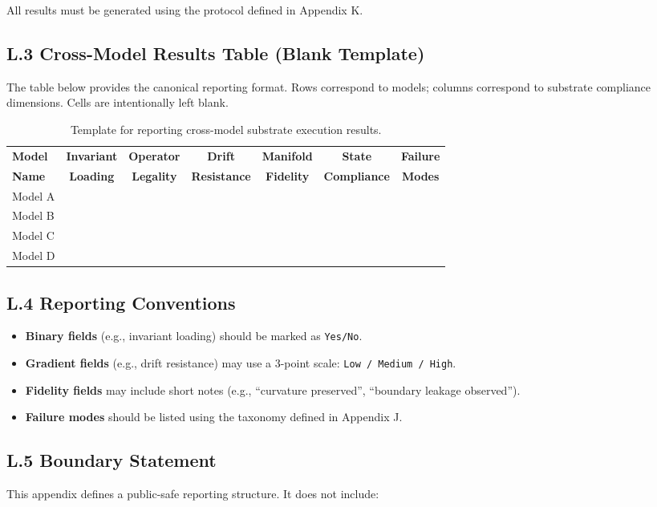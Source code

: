 All results must be generated using the protocol defined in Appendix K.

\subsection*{L.3 Cross-Model Results Table (Blank Template)}
The table below provides the canonical reporting format. Rows correspond to models; columns 
correspond to substrate compliance dimensions. Cells are intentionally left blank.

\begin{table}[h!]
\centering
\begin{tabular}{|l|c|c|c|c|c|c|}
\hline
\textbf{Model} & 
\textbf{Invariant} & 
\textbf{Operator} & 
\textbf{Drift} & 
\textbf{Manifold} & 
\textbf{State} & 
\textbf{Failure} \\
\textbf{Name} & 
\textbf{Loading} & 
\textbf{Legality} & 
\textbf{Resistance} & 
\textbf{Fidelity} & 
\textbf{Compliance} & 
\textbf{Modes} \\
\hline
Model A & & & & & & \\
\hline
Model B & & & & & & \\
\hline
Model C & & & & & & \\
\hline
Model D & & & & & & \\
\hline
\end{tabular}
\caption{Template for reporting cross-model substrate execution results.}
\end{table}

\subsection*{L.4 Reporting Conventions}
\begin{itemize}
    \item \textbf{Binary fields} (e.g., invariant loading) should be marked as \texttt{Yes/No}.
    \item \textbf{Gradient fields} (e.g., drift resistance) may use a 3-point scale: 
    \texttt{Low / Medium / High}.
    \item \textbf{Fidelity fields} may include short notes (e.g., ``curvature preserved'', 
    ``boundary leakage observed'').
    \item \textbf{Failure modes} should be listed using the taxonomy defined in Appendix J.
\end{itemize}

\subsection*{L.5 Boundary Statement}
This appendix defines a public-safe reporting structure. It does not include:

